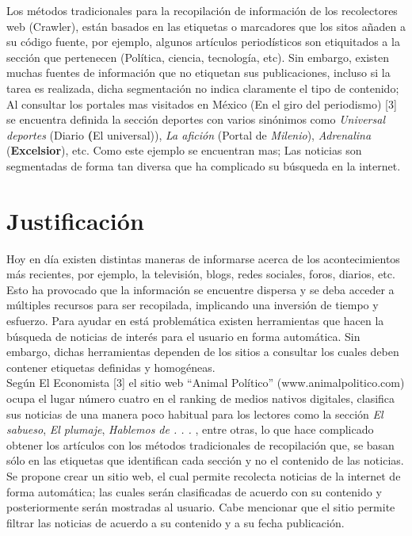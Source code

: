 Los métodos tradicionales para la recopilación de información de los recolectores web (Crawler), están basados en las etiquetas o marcadores que los sitos añaden a su código fuente, por ejemplo, algunos artículos periodísticos son etiquitados a la sección que pertenecen (Política, ciencia, tecnología, etc). Sin embargo, existen muchas fuentes de información que no etiquetan sus publicaciones, incluso si la tarea es realizada, dicha segmentación no indica claramente el tipo de contenido; Al consultar los portales mas visitados en México (En el giro del periodismo) [3] se encuentra definida la sección deportes con varios sinónimos como \textit{Universal deportes} (Diario \textbf(El universal)), \textit{La afición} (Portal de \textit{Milenio}), \textit{Adrenalina} (\textbf{Excelsior}), etc. Como este ejemplo se encuentran mas; Las noticias son segmentadas de forma tan diversa que ha complicado su búsqueda en la internet.


\section{Justificación}



Hoy en día existen distintas maneras de informarse acerca de los acontecimientos más recientes, por ejemplo, la televisión, blogs, redes sociales, foros,
diarios, etc. Esto ha provocado que la información se encuentre dispersa y
se deba acceder a múltiples recursos para ser recopilada, implicando
una inversión de tiempo y esfuerzo. Para ayudar en está problemática existen herramientas
que hacen la búsqueda de noticias de interés para el usuario en forma automática. Sin embargo, dichas herramientas dependen de los sitios a consultar los cuales deben contener etiquetas definidas y homogéneas.\\

Según El Economista [3] el sitio web “Animal Político” (www.animalpolitico.com)
ocupa el lugar número cuatro en el ranking de medios nativos digitales, clasifica sus noticias de una manera poco habitual para los lectores como la sección
\textit{El sabueso}, \textit{El plumaje}, \textit{Hablemos de . . . }, entre otras, lo que hace complicado obtener los artículos con los métodos tradicionales de recopilación que,
se basan sólo en las etiquetas que identifican cada sección y no el contenido de
las noticias. Se propone crear un sitio web, el cual permite recolecta noticias de la internet
de forma automática; las cuales serán clasificadas de acuerdo con su contenido y
posteriormente serán mostradas al usuario. Cabe mencionar que el sitio permite filtrar las noticias de
acuerdo a su contenido y a su fecha publicación.


